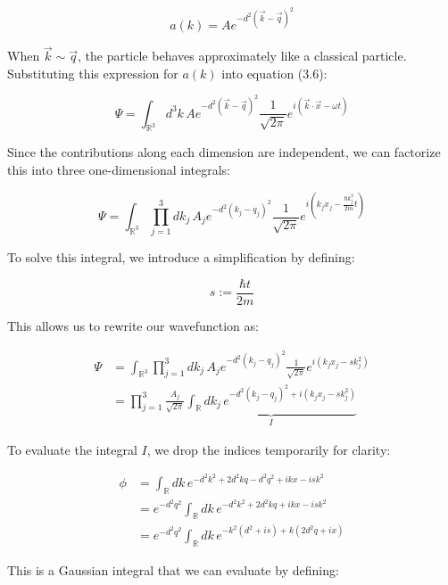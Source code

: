 \documentclass[italian]{HKNdocument}
\begin{document}
\begin{equation*}
a(k) = Ae^{-d^2(\vec{k}-\vec{q})^2} \tag{3.9}
\end{equation*}

When $\vec{k} \sim \vec{q}$, the particle behaves approximately like a classical particle. Substituting this expression for $a(k)$ into equation (3.6):

\begin{equation*}
\Psi = \int_{\mathbb{R}^3}d^3k\,Ae^{-d^2(\vec{k}-\vec{q})^2}\frac{1}{\sqrt{2\pi}}e^{i(\vec{k}\cdot\vec{x}-\omega t)} \tag{3.10}
\end{equation*}

Since the contributions along each dimension are independent, we can factorize this into three one-dimensional integrals:

\begin{equation*}
\Psi = \int_{\mathbb{R}^3}\prod_{j=1}^3 dk_j\,A_je^{-d^2(k_j-q_j)^2}\frac{1}{\sqrt{2\pi}}e^{i(k_jx_j-\frac{\hbar k_j^2}{2m}t)} \tag{3.11}
\end{equation*}


To solve this integral, we introduce a simplification by defining:

\begin{equation*}
s := \frac{\hbar t}{2m} \tag{3.12}
\end{equation*}

This allows us to rewrite our wavefunction as:

\begin{align*}
\Psi &= \int_{\mathbb{R}^3}\prod_{j=1}^3dk_j\,A_je^{-d^2(k_j-q_j)^2}\frac{1}{\sqrt{2\pi}}e^{i(k_jx_j-sk_j^2)} \\
&= \prod_{j=1}^3\frac{A_j}{\sqrt{2\pi}}\underbrace{\int_{\mathbb{R}}dk_j\,e^{-d^2(k_j-q_j)^2+i(k_jx_j-sk_j^2)}}_{I} \tag{3.13}
\end{align*}

To evaluate the integral $I$, we drop the indices temporarily for clarity:

\begin{align*}
\phi &= \int_{\mathbb{R}}dk\,e^{-d^2k^2+2d^2kq-d^2q^2+ikx-isk^2} \\
&= e^{-d^2q^2}\int_{\mathbb{R}}dk\,e^{-d^2k^2+2d^2kq+ikx-isk^2} \tag{3.14} \\
&= e^{-d^2q^2}\int_{\mathbb{R}}dk\,e^{-k^2(d^2+is)+k(2d^2q+ix)}
\end{align*}

This is a Gaussian integral that we can evaluate by defining:
\end{document}

